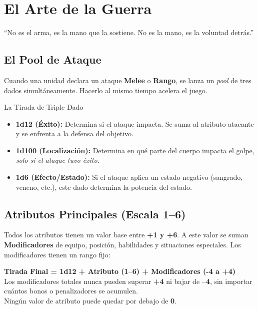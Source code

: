 
\chapter{El Arte de la Guerra}

\begin{loreblock}
``No es el arma, es la mano que la sostiene. No es la mano, es la voluntad detrás.''
\end{loreblock}

\vspace{0.4cm}

\section{El Pool de Ataque}

Cuando una unidad declara un ataque \textbf{Melee} o \textbf{Rango}, se lanza un \textit{pool} de tres dados simultáneamente. Hacerlo al mismo tiempo acelera el juego.

\begin{reglaespecial}{La Tirada de Triple Dado}
\begin{itemize}
    \item \textbf{1d12 (Éxito):} Determina si el ataque impacta. Se suma al atributo atacante y se enfrenta a la defensa del objetivo.
    \item \textbf{1d100 (Localización):} Determina en qué parte del cuerpo impacta el golpe, \textit{solo si el ataque tuvo éxito}.
    \item \textbf{1d6 (Efecto/Estado):} Si el ataque aplica un estado negativo (sangrado, veneno, etc.), este dado determina la potencia del estado.
\end{itemize}
\end{reglaespecial}

\section{Atributos Principales (Escala 1--6)}

Todos los atributos tienen un valor base entre \textbf{+1 y +6}. A este valor se suman \textbf{Modificadores} de equipo, posición, habilidades y situaciones especiales. Los modificadores tienen un rango fijo:

\begin{tcolorbox}[colback=HammerRed!8, colframe=HammerRed]
\centering
\large \textbf{Tirada Final = 1d12 + Atributo (1--6) + Modificadores (-4 a +4)}\\[4pt]
\small Los modificadores totales nunca pueden superar \textbf{+4} ni bajar de \textbf{--4}, sin importar cuántos bonos o penalizadores se acumulen.\\
Ningún valor de atributo puede quedar por debajo de \textbf{0}.
\end{tcolorbox}

